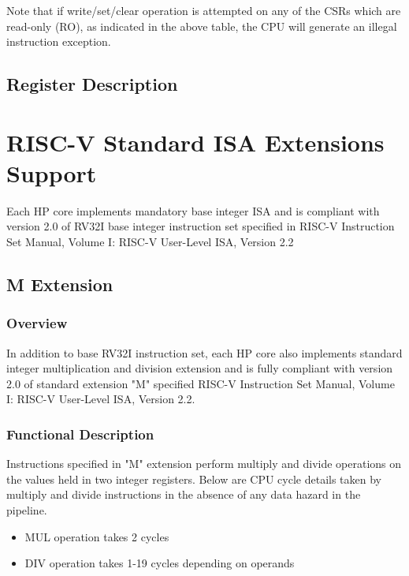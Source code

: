 \documentclass[main\_\_EN.tex]{subfiles}
\begin{document}

Note that if write/set/clear operation is attempted on any of the CSRs which are read-only (RO), as indicated in the above table, the CPU will generate an illegal instruction exception.

\subsection{Register Description}


\newpage
\section{RISC-V Standard ISA Extensions Support}


Each HP core implements mandatory base integer ISA and is compliant with version 2.0 of RV32I base integer instruction set specified in RISC-V Instruction Set Manual, Volume I: RISC-V User-Level ISA, Version 2.2

\subsection{M Extension}
\label{sec:riscvcpu-mext}
\subsubsection{Overview}
\label{sec:riscvcpu-mext-overview}
In addition to base RV32I instruction set, each HP core also implements standard integer multiplication and division extension and is fully compliant with version 2.0 of standard extension "M" specified RISC-V Instruction Set Manual, Volume I: RISC-V User-Level ISA, Version 2.2.

\subsubsection{Functional Description}
\label{sec:riscvcpu-mext-func-descr}

Instructions specified in "M" extension perform multiply and divide operations on the values held in two integer registers. Below are CPU cycle details taken by multiply and divide instructions in the absence of any data hazard in the pipeline.

\begin{itemize}
    \item MUL operation takes 2 cycles
    \item DIV operation takes 1-19 cycles depending on operands
\end{itemize}
\end{document}
